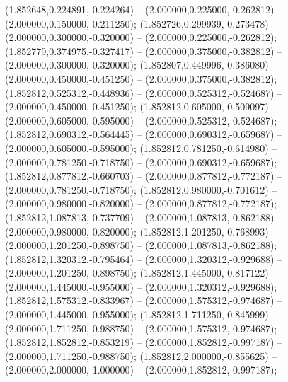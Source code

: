  (1.852648,0.224891,-0.224264) -- (2.000000,0.225000,-0.262812) -- (2.000000,0.150000,-0.211250);
 (1.852726,0.299939,-0.273478) -- (2.000000,0.300000,-0.320000) -- (2.000000,0.225000,-0.262812);
 (1.852779,0.374975,-0.327417) -- (2.000000,0.375000,-0.382812) -- (2.000000,0.300000,-0.320000);
 (1.852807,0.449996,-0.386080) -- (2.000000,0.450000,-0.451250) -- (2.000000,0.375000,-0.382812);
 (1.852812,0.525312,-0.448936) -- (2.000000,0.525312,-0.524687) -- (2.000000,0.450000,-0.451250);
 (1.852812,0.605000,-0.509097) -- (2.000000,0.605000,-0.595000) -- (2.000000,0.525312,-0.524687);
 (1.852812,0.690312,-0.564445) -- (2.000000,0.690312,-0.659687) -- (2.000000,0.605000,-0.595000);
 (1.852812,0.781250,-0.614980) -- (2.000000,0.781250,-0.718750) -- (2.000000,0.690312,-0.659687);
 (1.852812,0.877812,-0.660703) -- (2.000000,0.877812,-0.772187) -- (2.000000,0.781250,-0.718750);
 (1.852812,0.980000,-0.701612) -- (2.000000,0.980000,-0.820000) -- (2.000000,0.877812,-0.772187);
 (1.852812,1.087813,-0.737709) -- (2.000000,1.087813,-0.862188) -- (2.000000,0.980000,-0.820000);
 (1.852812,1.201250,-0.768993) -- (2.000000,1.201250,-0.898750) -- (2.000000,1.087813,-0.862188);
 (1.852812,1.320312,-0.795464) -- (2.000000,1.320312,-0.929688) -- (2.000000,1.201250,-0.898750);
 (1.852812,1.445000,-0.817122) -- (2.000000,1.445000,-0.955000) -- (2.000000,1.320312,-0.929688);
 (1.852812,1.575312,-0.833967) -- (2.000000,1.575312,-0.974687) -- (2.000000,1.445000,-0.955000);
 (1.852812,1.711250,-0.845999) -- (2.000000,1.711250,-0.988750) -- (2.000000,1.575312,-0.974687);
 (1.852812,1.852812,-0.853219) -- (2.000000,1.852812,-0.997187) -- (2.000000,1.711250,-0.988750);
 (1.852812,2.000000,-0.855625) -- (2.000000,2.000000,-1.000000) -- (2.000000,1.852812,-0.997187);
